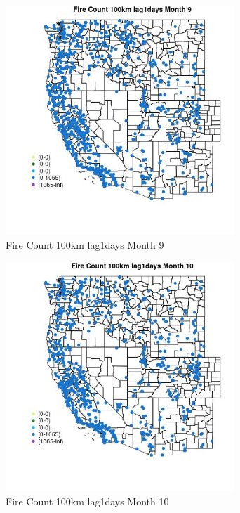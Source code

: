 \begin{figure} 
\centering  
\includegraphics[width=0.77\textwidth]{Code_Outputs/Report_ML_input_PM25_Step4_part_f_de_duplicated_aveswNAs_MapObsMo9Fire_Count_100km_lag1days.jpg} 
\caption{\label{fig:Report_ML_input_PM25_Step4_part_f_de_duplicated_aveswNAsMapObsMo9Fire_Count_100km_lag1days}Fire Count 100km lag1days Month 9} 
\end{figure} 
 

\begin{figure} 
\centering  
\includegraphics[width=0.77\textwidth]{Code_Outputs/Report_ML_input_PM25_Step4_part_f_de_duplicated_aveswNAs_MapObsMo10Fire_Count_100km_lag1days.jpg} 
\caption{\label{fig:Report_ML_input_PM25_Step4_part_f_de_duplicated_aveswNAsMapObsMo10Fire_Count_100km_lag1days}Fire Count 100km lag1days Month 10} 
\end{figure} 
 

